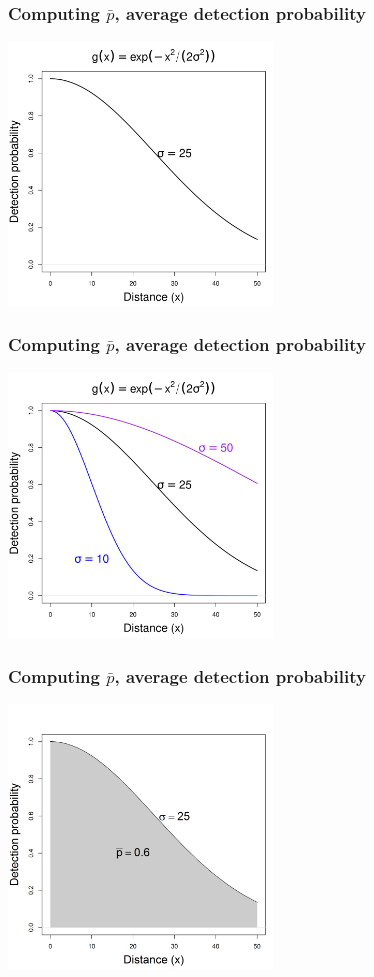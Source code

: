 \documentclass[color=usenames,dvipsnames,handout]{beamer}\usepackage[]{graphicx}\usepackage[]{xcolor}
\begin{document}
\begin{frame}
  \frametitle{Computing $\bar{p}$, average detection probability}
\begin{center}
  \includegraphics[width=7cm]{figs/detfun1}
\end{center}
\end{frame}




\begin{frame}
  \frametitle{Computing $\bar{p}$, average detection probability}
\begin{center}
  \includegraphics[width=7cm]{figs/detfun2}
\end{center}
\end{frame}



\begin{frame}
  \frametitle{Computing $\bar{p}$, average detection probability}
\begin{center}
  \includegraphics[width=7cm]{figs/detfun3}
\end{center}
\end{frame}
\end{document}
